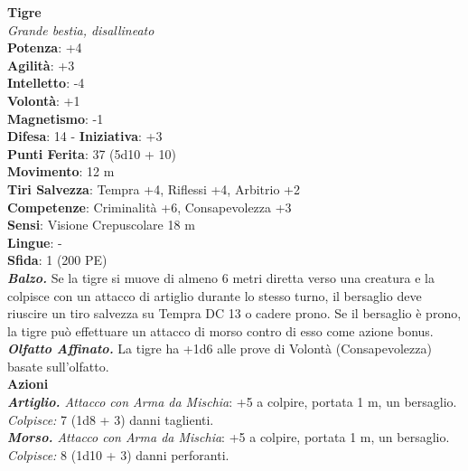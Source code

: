 \begin{multicols}{2}
\medskip\textbf{Tigre}\\
\emph{Grande bestia, disallineato}\\
\textbf{Potenza}: +4\\
\textbf{Agilità}: +3\\
\textbf{Intelletto}: -4\\
\textbf{Volontà}: +1\\
\textbf{Magnetismo}: -1\\
\textbf{Difesa}: 14 - \textbf{Iniziativa}: +3\\
\textbf{Punti Ferita}: 37 (5d10 + 10)\\
\textbf{Movimento}: 12 m\\
\textbf{Tiri Salvezza}: Tempra +4, Riflessi +4, Arbitrio +2\\
\textbf{Competenze}: Criminalità +6, Consapevolezza +3\\
\textbf{Sensi}: Visione Crepuscolare 18 m\\
\textbf{Lingue}: -\\
\textbf{Sfida}: 1 (200 PE)\smallskip\\
\emph{\textbf{Balzo.}} Se la tigre si muove di almeno 6 metri diretta verso una creatura e la colpisce con un attacco di artiglio durante lo stesso turno, il bersaglio deve riuscire un tiro salvezza su Tempra DC 13 o cadere prono. Se il bersaglio è prono, la tigre può effettuare un attacco di morso contro di esso come azione bonus.
\emph{\textbf{Olfatto Affinato.}} La tigre ha +1d6 alle prove di Volontà (Consapevolezza) basate sull'olfatto.\\
\smallskip\textbf{Azioni}\\
\emph{\textbf{Artiglio.} Attacco con Arma da Mischia}: +5 a colpire, portata 1 m, un bersaglio.\\
\emph{Colpisce:} 7 (1d8 + 3) danni taglienti.\\
\emph{\textbf{Morso.} Attacco con Arma da Mischia}: +5 a colpire, portata 1 m, un bersaglio.\\
\emph{Colpisce:} 8 (1d10 + 3) danni perforanti.\\


\end{multicols}
